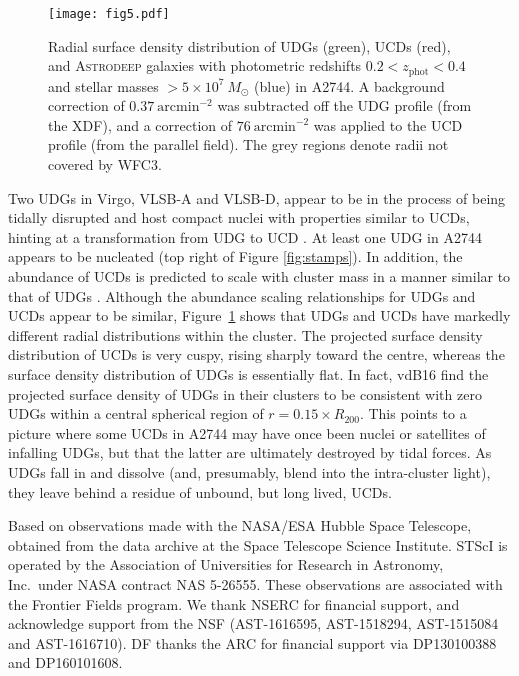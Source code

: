 \documentclass[iop,tighten,twocolumn,apj]{emulateapj}
\begin{document}
\begin{figure}
	\texttt{[image: fig5.pdf]}
	\caption{
	Radial surface density distribution of UDGs (green), UCDs (red), and
	\textsc{Astrodeep} \citep{merlin2016,castellano2016} galaxies with
	photometric redshifts $0.2 < z_\mathrm{phot} < 0.4$ and stellar masses
	$> 5\times10^7~M_\odot$ (blue) in A2744.
	A background correction of $0.37~\mathrm{arcmin}^{-2}$ was
	subtracted off the UDG profile (from the XDF), and a correction of
	$76~\mathrm{arcmin}^{-2}$ was applied to the UCD profile (from the
	parallel field).
	The grey regions denote radii not covered by WFC3.
	\label{fig:radial}
	}
\end{figure}

Two UDGs in Virgo, VLSB-A and VLSB-D, appear to be in the process of being
tidally disrupted and host compact nuclei with properties similar to UCDs,
hinting at a transformation from UDG to UCD \citep{mihos2016}. At least one
UDG in A2744 appears to be nucleated (top right of Figure \ref{fig:stamps}).
In addition, the abundance of UCDs is predicted to scale with cluster mass in
a manner similar to that of UDGs \citep[$N_\mathrm{UCD} \propto
M^{0.87}$,][]{pfeffer2014}.  Although the abundance scaling relationships for
UDGs and UCDs appear to be similar, Figure~\ref{fig:radial} shows that UDGs
and UCDs have markedly different radial distributions within the cluster. The
projected surface density distribution of UCDs is very cuspy, rising sharply
toward the centre, whereas the surface density distribution of UDGs is
essentially flat. In fact, vdB16 find the projected surface density of UDGs in
their clusters to be consistent with zero UDGs within a central spherical
region of $r = 0.15 \times R_{200}$.
This points to a picture where some UCDs in A2744 may have once been nuclei or
satellites of infalling UDGs, but that the latter are ultimately destroyed by
tidal forces. As UDGs fall in and dissolve (and, presumably, blend into the
intra-cluster light), they leave behind a residue of unbound, but long lived,
UCDs.

\acknowledgements
Based on observations made with the NASA/ESA Hubble Space Telescope, obtained
from the data archive at the Space Telescope Science Institute. STScI is
operated by the Association of Universities for Research in Astronomy, Inc.\
under NASA contract NAS 5-26555.
These observations are associated with the
Frontier Fields program. We thank NSERC for financial support, and acknowledge
support from the NSF (AST-1616595, AST-1518294, AST-1515084 and AST-1616710).
DF thanks the ARC for financial support via DP130100388 and DP160101608. 
\end{document}
